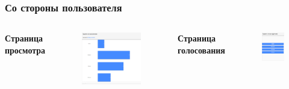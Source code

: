 \documentclass{beamer}
\begin{document}
\begin{frame}
\frametitle{Со стороны пользователя}
\begin{columns}[c]

\centering
\textbf{Страница просмотра}
\begin{figure}
	\includegraphics[width=\linewidth]{img/view.PNG}
\end{figure}


\centering
\textbf{Страница голосования}
\begin{figure}
	\includegraphics[width=\linewidth]{img/slave.PNG}
\end{figure}



\end{columns}
\end{frame}
\end{document}
